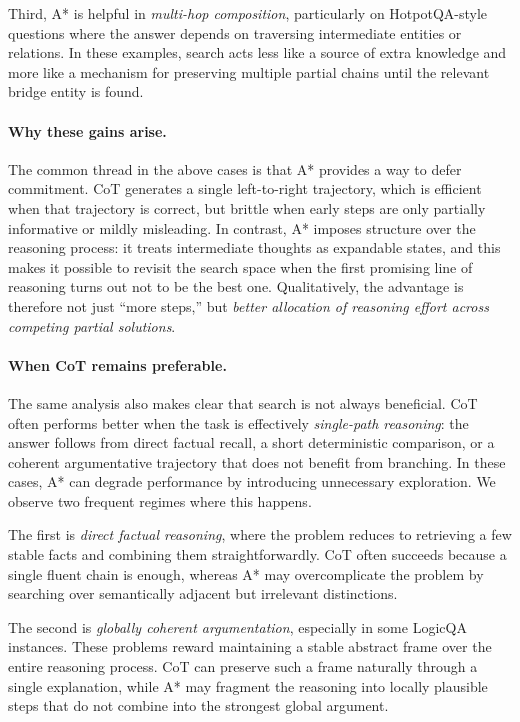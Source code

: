 \documentclass[11pt]{article}
\begin{document}
Third, A* is helpful in \emph{multi-hop composition}, particularly on HotpotQA-style questions where the answer depends on traversing intermediate entities or relations. In these examples, search acts less like a source of extra knowledge and more like a mechanism for preserving multiple partial chains until the relevant bridge entity is found.

\paragraph{Why these gains arise.}
The common thread in the above cases is that A* provides a way to defer commitment. CoT generates a single left-to-right trajectory, which is efficient when that trajectory is correct, but brittle when early steps are only partially informative or mildly misleading. In contrast, A* imposes structure over the reasoning process: it treats intermediate thoughts as expandable states, and this makes it possible to revisit the search space when the first promising line of reasoning turns out not to be the best one. Qualitatively, the advantage is therefore not just ``more steps,'' but \emph{better allocation of reasoning effort across competing partial solutions}.

\paragraph{When CoT remains preferable.}
The same analysis also makes clear that search is not always beneficial. CoT often performs better when the task is effectively \emph{single-path reasoning}: the answer follows from direct factual recall, a short deterministic comparison, or a coherent argumentative trajectory that does not benefit from branching. In these cases, A* can degrade performance by introducing unnecessary exploration. We observe two frequent regimes where this happens.

The first is \emph{direct factual reasoning}, where the problem reduces to retrieving a few stable facts and combining them straightforwardly. CoT often succeeds because a single fluent chain is enough, whereas A* may overcomplicate the problem by searching over semantically adjacent but irrelevant distinctions.

The second is \emph{globally coherent argumentation}, especially in some LogicQA instances. These problems reward maintaining a stable abstract frame over the entire reasoning process. CoT can preserve such a frame naturally through a single explanation, while A* may fragment the reasoning into locally plausible steps that do not combine into the strongest global argument.
\end{document}
